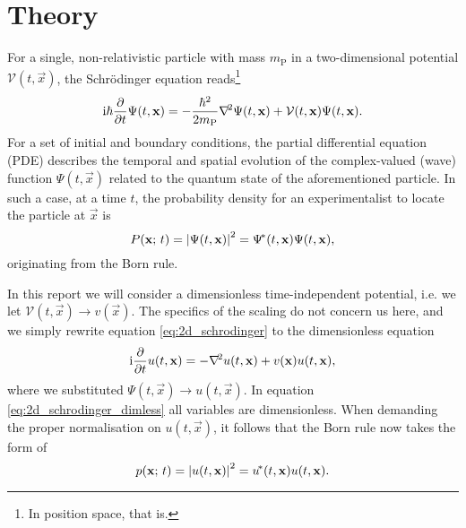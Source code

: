 
\section{Theory}\label{sec:theory}
    For a single, non-relativistic particle with mass $m_\mathrm{P}$ in a two-dimensional potential $\mathcal{V}(t, \vec{x})$, the Schrödinger equation reads\footnote{In position space, that is.}
    \begin{equation}\label{eq:2d_schrodinger}
        \mathrm{i} \hbar \pdv{}{t}\Psi(t, \mathbf{x}) = -\frac{\hbar^2}{2m_\mathrm{P}}\nabla^{\!2} \Psi(t, \mathbf{x})  + \mathcal{V}(t, \mathbf{x}) \Psi(t, \mathbf{x}).
    \end{equation}
    For a set of initial and boundary conditions, the partial differential equation (PDE) describes the temporal and spatial evolution of the complex-valued (wave) function $\Psi(t, \vec{x})$ related to the quantum state of the aforementioned particle. In such a case, at a time $t$, the probability density for an experimentalist to locate the particle at $\vec{x}$ is
    \begin{equation}\label{eq:2d_bornrule}
        P(\mathbf{x}; \, t) = \abs{\Psi(t, \mathbf{x})}^2 = \Psi^{\!*}(t, \mathbf{x}) \Psi(t, \mathbf{x}),
    \end{equation} 
    originating from the Born rule.

    In this report we will consider a dimensionless time-independent potential, i.e. we let $\mathcal{V}(t, \vec{x}) \to v(\vec{x})$. The specifics of the scaling do not concern us here, and we simply rewrite equation \eqref{eq:2d_schrodinger} to the dimensionless equation
    \begin{equation}\label{eq:2d_schrodinger_dimless}
        \mathrm{i} \pdv{}{t}u(t, \mathbf{x}) = - \nabla^{\!2}u(t, \mathbf{x})+ v(\mathbf{x})u(t, \mathbf{x}),
    \end{equation}
    where we substituted $\Psi(t, \vec{x}) \to u(t, \vec{x})$. In equation \eqref{eq:2d_schrodinger_dimless} all variables are dimensionless. When demanding the proper normalisation on $u(t,\vec{x})$, it follows that the Born rule now takes the form of
    \begin{equation}\label{eq:2d_bornrule_dimless}
        p(\mathbf{x}; \, t) = \abs{u(t, \mathbf{x})}^2 = u^{\!*} (t, \mathbf{x})u(t, \mathbf{x}).
    \end{equation}

